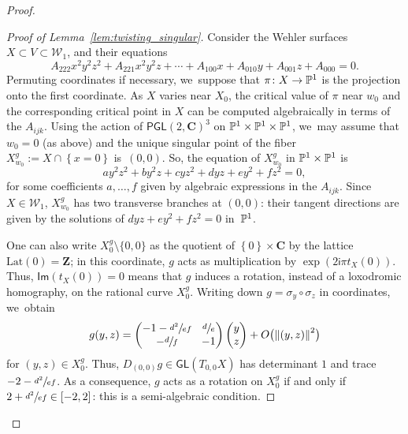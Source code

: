 \documentclass[11pt]{article}
\newcommand{\set}[1]{\left\{#1\right\}}
\newcommand{\norm}[1]{{\left\Vert#1\right\Vert}}
\newcommand{\blrpar}[1]{\bigl(#1\bigr)}
\def\C{\mathbf{C}}
\def\Z{\mathbf{Z}}
\newcommand{\cW}{\mathcal{W}}
\newcommand{\Lat}{{\mathrm{Lat}}}
\newcommand\ii{{\mathsf{i}}}
\newcommand{\Ima}{{\mathsf{Im}}}
\newcommand\PGL{{\mathsf{PGL}}}
\newcommand\GL{{\mathsf{GL}}}
\theoremstyle{plain}
\theoremstyle{definition}
\numberwithin{equation}{section}
\begin{document}
\begin{proof}
\begin{proof}[Proof of Lemma~\ref{lem:twisting_singular}]
Consider the Wehler surfaces $X\subset V\subset \cW_1$, and their equations
\begin{equation*}
A_{222} x^2y^2z^2+ A_{221}x^2y^2z+\cdots + A_{100}x + A_{010}y+A_{001}z + A_{000} = 0.
\end{equation*}
Permuting coordinates if necessary, we~suppose that $\pi\colon X\to \P^1$ is the projection onto the first coordinate.
As $X$ varies near $X_0$, the critical value of $\pi$ near $w_0$ and the corresponding critical point in $X$ can be computed algebraically in terms of the $A_{ijk}$. Using the action of $\PGL(2, \C)^3$ on $\P^1\times \P^1\times \P^1$, we~may
assume that $w_0=0$ (as above) and the unique singular point of the fiber $X_{w_0}^g:=X \cap \set{x= 0}$ is~$(0,0)$.
So, the equation of $X_{w_0}^g$ in $\P^1\times \P^1$ is
\begin{equation*}
ay^2z^2 + b y^2z+cy z^2+ dyz+ey^2+f z^2 = 0,
\end{equation*}
for some coefficients $a, \ldots , f$ given by algebraic expressions in the $A_{ijk}$.
Since $X\in \cW_1$, $X_{w_0}^g$ has two transverse branches at $(0,0)$: their tangent directions are given
by the solutions of $dyz+ey^2+f z^2 = 0$ in~$\P^1$.

One can also write $X_0^g\setminus\{0,0\}$ as the quotient of $\set{0}\times \C$ by the lattice $\Lat(0)=\Z$; in this coordinate,
$g$ acts as multiplication by $\exp(2\ii \pi t_X(0))$. Thus, $\Ima(t_X(0)) = 0$ means that $g$ induces a rotation, instead of a loxodromic homography, on the rational curve $X_0^g$. Writing down $g = \sigma_y\circ \sigma_z$ in coordinates, we~obtain
\begin{equation*}\arraycolsep4.5pt
g(y,z) = \begin{pmatrix}-1 - \sfrac{d^2}{ef}& \sfrac{d}{e} \\ -\sfrac{d}{f} & -1
\end{pmatrix}\begin{pmatrix} y\\z\end{pmatrix} + O\blrpar{\norm{(y,z)}^2}
\end{equation*}
for $(y,z)\in X_0^g$.
Thus, $D_{(0, 0)}g\in \GL(T_{0,0}X)$ has determinant $1$ and trace $ - 2- \sfrac{d^2}{ef}$.
As a consequence, $g$ acts as a rotation on $X_0^g$ if and only if $ 2 + \sfrac{d^2}{ef} \in[-2, 2]$: this is a semi-algebraic condition.
\end{proof}


\end{proof}
\end{document}
